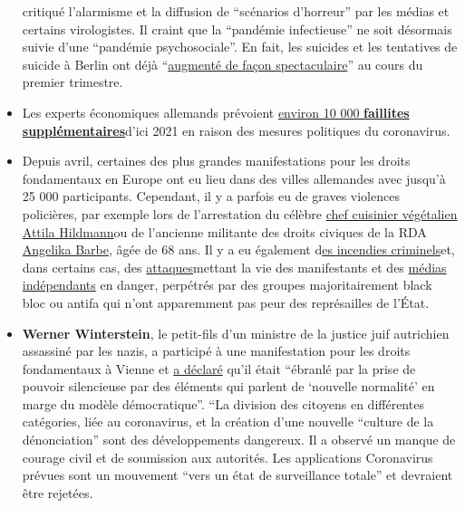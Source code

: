 \begin{itemize}
  critiqué l'alarmisme et la diffusion de ``scénarios d'horreur'' par
  les médias et certains virologistes. Il craint que la ``pandémie
  infectieuse'' ne soit désormais suivie d'une ``pandémie
  psychosociale''. En fait, les suicides et les tentatives de suicide à
  Berlin ont déjà
  ``\href{https://www.tichyseinblick.de/daili-es-sentials/suizide-in-berlin-steigen-im-ersten-quartal-drastisch/}{augmenté
  de façon spectaculaire}'' au cours du premier trimestre.
\item
  Les experts économiques allemands prévoient
  \href{https://www.focus.de/finanzen/news/konjunktur/insgesamt-fast-30-000-insolvenzen-in-deutschland-experten-geben-erste-schaetzung-ab-corona-treibt-10-000-deutsche-firmen-in-die-pleite_id_12003269.html}{environ
  10 000 \textbf{faillites supplémentaires}}d'ici 2021 en raison des
  mesures politiques du coronavirus.
\item
  Depuis avril, certaines des plus grandes manifestations pour les
  droits fondamentaux en Europe ont eu lieu dans des villes allemandes
  avec jusqu'à 25 000 participants. Cependant, il y a parfois eu de
  graves violences policières, par exemple lors de l'arrestation du
  célèbre \href{https://www.youtube.com/watch?v=20HIEEQtyZ8}{chef
  cuisinier végétalien Attila Hildmann}ou de l'ancienne militante des
  droits civiques de la RDA
  \href{https://www.youtube.com/watch?v=fCbgVFRCnTc}{Angelika Barbe},
  âgée de 68 ans. Il y a eu également
  d\href{https://www.swr.de/swraktuell/baden-wuerttemberg/spreng-anschlag-100.html}{es
  incendies criminels}et, dans certains cas, des
  \href{https://www.swr.de/swraktuell/baden-wuerttemberg/stuttgart/corona-demo-in-stuttgart-ermittlungen-wegen-versuchter-toetung-100.html}{attaques}mettant
  la vie des manifestants et des
  \href{https://kenfm.de/anschlagsversuch-auf-ken-jebsen-tagesdosis-9-6-2020/}{médias
  indépendants} en danger, perpétrés par des groupes majoritairement
  black bloc ou antifa qui n'ont apparemment pas peur des représailles
  de l'État.
\item
  \textbf{Werner Winterstein}, le petit-fils d'un ministre de la justice
  juif autrichien assassiné par les nazis, a participé à une
  manifestation pour les droits fondamentaux à Vienne et
  \href{https://vimeo.com/418039066}{a déclaré} qu'il était ``ébranlé
  par la prise de pouvoir silencieuse par des éléments qui parlent de
  `nouvelle normalité' en marge du modèle démocratique''. ``La division
  des citoyens en différentes catégories, liée au coronavirus, et la
  création d'une nouvelle ``culture de la dénonciation'' sont des
  développements dangereux. Il a observé un manque de courage civil et
  de soumission aux autorités. Les applications Coronavirus prévues sont
  un mouvement ``vers un état de surveillance totale'' et devraient être
  rejetées.
\end{itemize}

